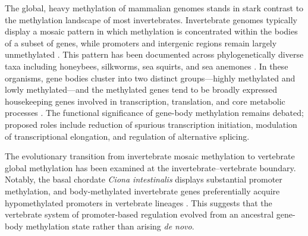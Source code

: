 \documentclass[12pt]{article}
\begin{document}
The global, heavy methylation of mammalian genomes stands in stark contrast to the methylation landscape of most invertebrates. Invertebrate genomes typically display a mosaic pattern in which methylation is concentrated within the bodies of a subset of genes, while promoters and intergenic regions remain largely unmethylated \cite{sardaEvolutionInvertebrateGene2012, kellerEvolutionaryTransitionPromoter2016}. This pattern has been documented across phylogenetically diverse taxa including honeybees, silkworms, sea squirts, and sea anemones \cite{sardaEvolutionInvertebrateGene2012}. In these organisms, gene bodies cluster into two distinct groups---highly methylated and lowly methylated---and the methylated genes tend to be broadly expressed housekeeping genes involved in transcription, translation, and core metabolic processes \cite{sardaEvolutionInvertebrateGene2012}. The functional significance of gene-body methylation remains debated; proposed roles include reduction of spurious transcription initiation, modulation of transcriptional elongation, and regulation of alternative splicing.

The evolutionary transition from invertebrate mosaic methylation to vertebrate global methylation has been examined at the invertebrate--vertebrate boundary. Notably, the basal chordate \textit{Ciona intestinalis} displays substantial promoter methylation, and body-methylated invertebrate genes preferentially acquire hypomethylated promoters in vertebrate lineages \cite{kellerEvolutionaryTransitionPromoter2016}. This suggests that the vertebrate system of promoter-based regulation evolved from an ancestral gene-body methylation state rather than arising \textit{de novo}.
\end{document}
